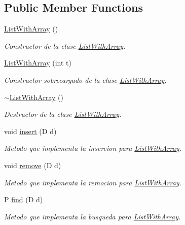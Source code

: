 \subsection*{Public Member Functions}
\begin{DoxyCompactItemize}
\item 
\hyperlink{class_list_with_array_a06f0e8035e9cc43aff4d32c46a00fcf0}{List\+With\+Array} ()
\begin{DoxyCompactList}\small\item\em Constructor de la clase \hyperlink{class_list_with_array}{List\+With\+Array}. \end{DoxyCompactList}\item 
\hyperlink{class_list_with_array_a3a6d11f203fb0f7e458672e85db26b03}{List\+With\+Array} (int t)
\begin{DoxyCompactList}\small\item\em Constructor sobrecargado de la clase \hyperlink{class_list_with_array}{List\+With\+Array}. \end{DoxyCompactList}\item 
\hyperlink{class_list_with_array_a1886482555430b0f3eb5ebe02cbb0c87}{$\sim$\+List\+With\+Array} ()
\begin{DoxyCompactList}\small\item\em Destructor de la clase \hyperlink{class_list_with_array}{List\+With\+Array}. \end{DoxyCompactList}\item 
void \hyperlink{class_list_with_array_afa0b6d215c2cc1d3fe6b9b48d6b6917d}{insert} (D d)
\begin{DoxyCompactList}\small\item\em Metodo que implementa la insercion para \hyperlink{class_list_with_array}{List\+With\+Array}. \end{DoxyCompactList}\item 
void \hyperlink{class_list_with_array_aaa18e76fc128ca05151178d914901ec3}{remove} (D d)
\begin{DoxyCompactList}\small\item\em Metodo que implementa la remocion para \hyperlink{class_list_with_array}{List\+With\+Array}. \end{DoxyCompactList}\item 
P \hyperlink{class_list_with_array_a9a054a6d407dc5cb39575739fe412fff}{find} (D d)
\begin{DoxyCompactList}\small\item\em Metodo que implementa la busqueda para \hyperlink{class_list_with_array}{List\+With\+Array}. \end{DoxyCompactList}\item 

\end{DoxyCompactItemize}
